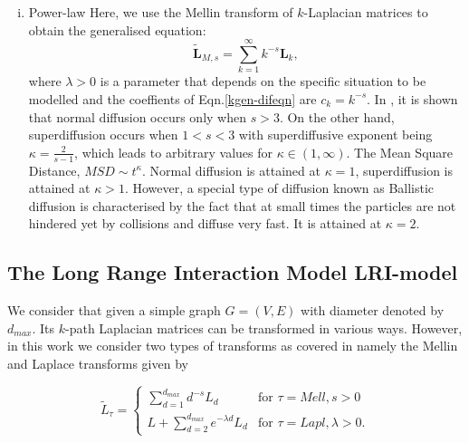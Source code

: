 \documentclass[10pt,a4paper]{article}
\begin{document}
\begin{enumerate}[i)]
    	    	\item Power-law 
    	    	Here, we use the Mellin transform of $k$-Laplacian matrices to obtain the generalised equation:
    	    	\begin{equation}
    	    	\tilde{\mathbf{L}}_{M,s} = \sum_{k=1}^{\infty} k^{-s} \mathbf{L}_k,
    	    	\label{mellin-transforms}
    	    	\end{equation}
    	    	where $\lambda >0$ is a parameter that depends on the specific situation to be modelled and the coeffients of Eqn.\ref{kgen-difeqn} are $c_{k} = k^{-s}$. 	
    	    	In \citep{estrada2017path}, it is shown that normal diffusion occurs only when $s > 3$. On the other hand, superdiffusion occurs when $1 <s < 3$ with superdiffusive exponent being $ \kappa = \frac{2}{s-1}$,
    	    	which leads to arbitrary values for $\kappa \in (1,\infty)$. 
    	    	The Mean Square Distance, $MSD \sim t^\kappa$. Normal diffusion is attained  at $\kappa =1$, superdiffusion is attained at $\kappa > 1$. However, a special type of diffusion known as Ballistic diffusion is characterised by the fact that at small times the particles are not hindered yet
    	    	by collisions and diffuse very fast. It is attained at $\kappa = 2$.
    	    \end{enumerate}
        \subsection{The Long Range Interaction Model LRI-model}
        We consider that given a simple graph $G=(V,E)$ with diameter denoted by $d_{max}$. Its $k$-path Laplacian matrices can be transformed in various ways. However, in this work we consider two types of transforms as covered in \citep{estrada2017path} namely the Mellin and Laplace transforms given by
        
        \begin{equation}
        \tilde{L}_{\tau} = \begin{cases} \sum_{d=1}^{d_{max}} d^{-s} L_d &\mbox{for } \tau = Mell, s>0 \\
        L + \sum_{d=2}^{d_{max}} e^{-\lambda d} L_d   & \mbox{for } \tau = Lapl, \lambda>0. \end{cases} 
        \end{equation}
        
\end{document}
